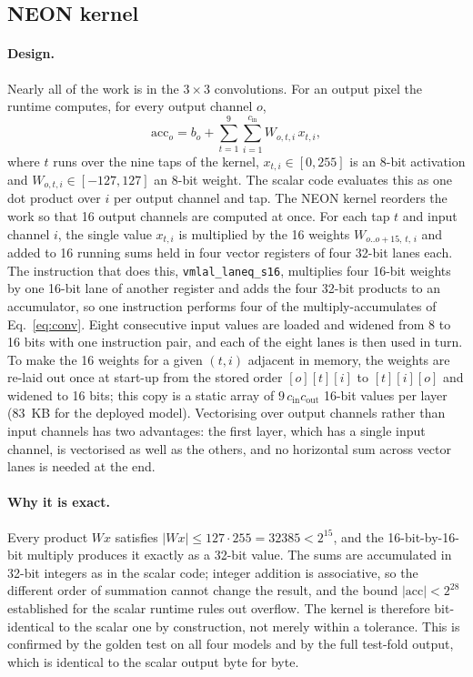 \documentclass[11pt,a4paper]{article}
\begin{document}
\subsection{NEON kernel}
\label{sec:neon}

\paragraph{Design.} Nearly all of the work is in the $3 \times 3$
convolutions. For an output pixel the runtime computes, for every output
channel $o$,
\begin{equation}
  \mathrm{acc}_o = b_o + \sum_{t=1}^{9} \sum_{i=1}^{c_\text{in}} W_{o,t,i}\, x_{t,i},
  \label{eq:conv}
\end{equation}
where $t$ runs over the nine taps of the kernel, $x_{t,i} \in [0, 255]$ is
an 8-bit activation and $W_{o,t,i} \in [-127, 127]$ an 8-bit weight. The
scalar code evaluates this as one dot product over $i$ per output channel
and tap. The NEON kernel reorders the work so that 16 output channels are
computed at once. For each tap $t$ and input channel $i$, the single value
$x_{t,i}$ is multiplied by the 16 weights $W_{o..o+15,\,t,\,i}$ and added to
16 running sums held in four vector registers of four 32-bit lanes each.
The instruction that does this, \texttt{vmlal\_laneq\_s16}, multiplies four
16-bit weights by one 16-bit lane of another register and adds the four
32-bit products to an accumulator, so one instruction performs four of the
multiply-accumulates of Eq.~\eqref{eq:conv}. Eight consecutive input values
are loaded and widened from 8 to 16 bits with one instruction pair, and each
of the eight lanes is then used in turn. To make the 16 weights for a given
$(t, i)$ adjacent in memory, the weights are re-laid out once at start-up
from the stored order $[o][t][i]$ to $[t][i][o]$ and widened to 16 bits;
this copy is a static array of $9\, c_\text{in} c_\text{out}$ 16-bit values
per layer (83~KB for the deployed model). Vectorising over output channels
rather than input channels has two advantages: the first layer, which has a
single input channel, is vectorised as well as the others, and no horizontal
sum across vector lanes is needed at the end.

\paragraph{Why it is exact.} Every product $W x$ satisfies $|W x| \le 127
\cdot 255 = \num{32385} < 2^{15}$, and the 16-bit-by-16-bit multiply produces
it exactly as a 32-bit value. The sums are accumulated in 32-bit integers as
in the scalar code; integer addition is associative, so the different order
of summation cannot change the result, and the bound $|\mathrm{acc}| <
2^{28}$ established for the scalar runtime rules out overflow. The kernel is
therefore bit-identical to the scalar one by construction, not merely within
a tolerance. This is confirmed by the golden test on all four models and by
the full test-fold output, which is identical to the scalar output byte for
byte.
\end{document}
